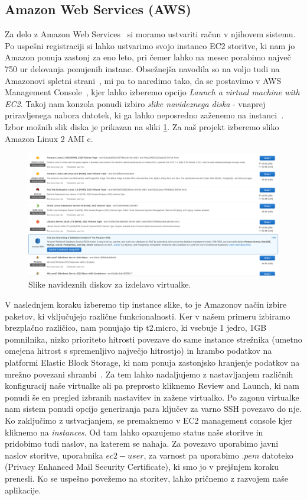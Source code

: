 \subsection{Amazon Web Services (AWS)}

Za delo z Amazon Web Services~\cite{1_aws_amazon} si moramo ustvariti račun v njihovem sistemu. Po uspešni registraciji si lahko ustvarimo svojo instanco EC2 storitve, ki nam jo Amazon ponuja zastonj za eno leto, pri čemer lahko na mesec porabimo največ 750 ur delovanja ponujenih instanc. Obsežnejša navodila so na voljo tudi na Amazonovi spletni strani~\cite{1_aws_amazon_tutorial}, mi pa to naredimo tako, da se postavimo v AWS Management Console~\cite{1_aws_amazon_console}, kjer lahko izberemo opcijo \emph{Launch a virtual machine with EC2}. Takoj nam konzola ponudi izbiro \emph{slike navideznega diska} - vnaprej priravljenega nabora datotek, ki ga lahko neposredno zaženemo na instanci~\cite{1_aws_amazon_ami}. Izbor možnih slik diska je prikazan na sliki \ref{fig:1_AWS_images}. Za naš projekt izberemo sliko Amazon Linux 2 AMI c.

\begin{figure}[H]
    \centering
    \includegraphics[scale=0.25]{Img/1_AWS_images.png}
    \caption{Slike navideznih diskov za izdelavo virtualke.}
    \label{fig:1_AWS_images}
\end{figure}

V naslednjem koraku izberemo tip instance slike, to je Amazonov način izbire paketov, ki vključujejo različne funkcionalnosti. Ker v našem primeru izbiramo brezplačno različico, nam ponujajo tip t2.micro, ki vsebuje 1 jedro, 1GB pomnilnika, nizko prioriteto hitrosti povezave do same instance strežnika (umetno omejena hitrost s spremenljivo največjo hitrostjo) in hrambo podatkov na platformi Elastic Block Storage, ki nam ponuja zastonjsko hranjenje podatkov na mrežno povezani shrambi~\cite{1_aws_amazon_ebs}. Za tem lahko nadaljujemo z nastavljanjem različnih konfiguracij naše virtualke ali pa preprosto kliknemo Review and Launch, ki nam ponudi še en pregled izbranih nastavitev in zažene virtualko. Po zagonu virtualke nam sistem ponudi opcijo generiranja para ključev za varno SSH povezavo do nje. Ko zaključimo z ustvarjanjem, se premaknemo v EC2 management console kjer kliknemo na \emph{instances}. Od tam lahko opazujemo status naše storitve in pridobimo tudi naslov, na katerem se nahaja. Za povezavo uporabimo javni naslov storitve, uporabnika $ec2-user$, za varnost pa uporabimo $.pem$ datoteko (Privacy Enhanced Mail Security Certificate), ki smo jo v prejšnjem koraku prenesli. Ko se uspešno povežemo na storitev, lahko pričnemo z razvojem naše aplikacije.

